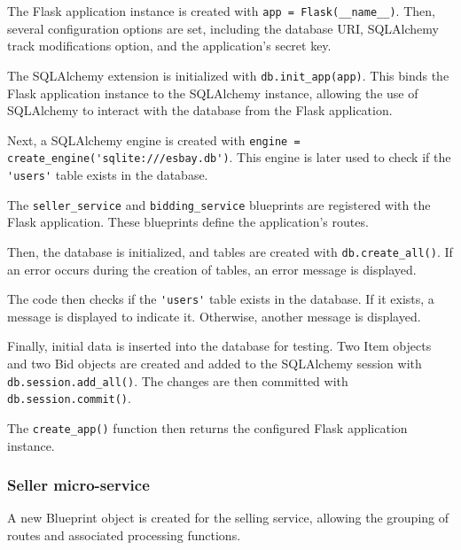 \documentclass[12pt]{article}
\begin{document}
The Flask application instance is created with \verb|app = Flask(__name__)|. Then, several configuration options are set, including the database URI, SQLAlchemy track modifications option, and the application's secret key.

The SQLAlchemy extension is initialized with \verb|db.init_app(app)|. This binds the Flask application instance to the SQLAlchemy instance, allowing the use of SQLAlchemy to interact with the database from the Flask application.

Next, a SQLAlchemy engine is created with \verb|engine = create_engine('sqlite:///esbay.db')|. This engine is later used to check if the \verb|'users'| table exists in the database.

The \verb|seller_service| and \verb|bidding_service| blueprints are registered with the Flask application. These blueprints define the application's routes.

Then, the database is initialized, and tables are created with \verb|db.create_all()|. If an error occurs during the creation of tables, an error message is displayed.

The code then checks if the \verb|'users'| table exists in the database. If it exists, a message is displayed to indicate it. Otherwise, another message is displayed.

Finally, initial data is inserted into the database for testing. Two Item objects and two Bid objects are created and added to the SQLAlchemy session with \verb|db.session.add_all()|. The changes are then committed with \verb|db.session.commit()|.

The \verb|create_app()| function then returns the configured Flask application instance.

\subsubsection{Seller micro-service}
A new Blueprint object is created for the selling service, allowing the grouping of routes and associated processing functions.
\end{document}
